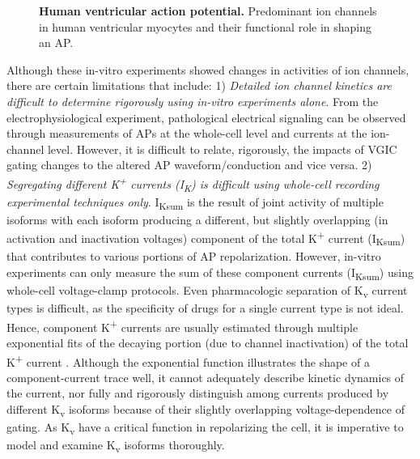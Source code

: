 \documentclass[10pt,letterpaper]{article}
\begin{document}
\begin{figure}[!ht]
    \centering
    \caption{{\bf Human ventricular action potential.} 
    Predominant ion channels in human ventricular myocytes and their functional role in shaping an AP.}
    \label{fig2}
\end{figure}

Although these in-vitro experiments showed changes in activities of ion channels, there are certain limitations that include: 1) \textit{Detailed ion channel kinetics are difficult to determine rigorously using in-vitro experiments alone}. From the electrophysiological experiment, pathological electrical signaling can be observed through measurements of APs at the whole-cell level and currents at the ion-channel level. However, it is difficult to relate, rigorously, the impacts of VGIC gating changes to the altered AP waveform/conduction and vice versa. 2) \textit{Segregating different K\textsuperscript{+} currents (I\textsubscript{K}) is difficult using whole-cell recording experimental techniques only}. I\textsubscript{Ksum} is the result of joint activity of multiple isoforms with each isoform producing a different, but slightly overlapping (in activation and inactivation voltages) component of the total K\textsuperscript{+} current (I\textsubscript{Ksum}) \cite{du2017} that contributes to various portions of AP repolarization. However, in-vitro experiments can only measure the sum of these component currents (I\textsubscript{Ksum}) using whole-cell voltage-clamp protocols. Even pharmacologic separation of K\textsubscript{v} current types is difficult, as the specificity of drugs for a single current type is not ideal. Hence, component K\textsuperscript{+} currents are usually estimated through multiple exponential fits of the decaying portion (due to channel inactivation) of the total K\textsuperscript{+} current \cite{brunet2004heterogeneous}. Although the exponential function illustrates the shape of a component-current trace well, it cannot adequately describe kinetic dynamics of the current, nor fully and rigorously distinguish among currents produced by different K\textsubscript{v} isoforms because of their slightly overlapping voltage-dependence of gating. As K\textsubscript{v} have a critical function in repolarizing the cell, it is imperative to model and examine K\textsubscript{v} isoforms thoroughly.
\end{document}
